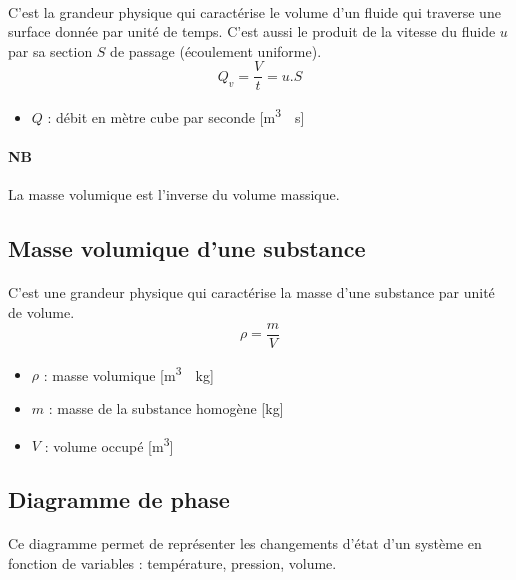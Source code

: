 \documentclass{article}
\begin{document}
            \paragraph{}
            C'est la grandeur physique qui caractérise le volume d'un fluide qui traverse une surface donnée par unité de temps. C'est aussi le produit de la vitesse du fluide $u$ par sa section $S$ de passage (écoulement uniforme).
            $$Q_v = \frac{V}{t} = u.S$$

            \begin{itemize}
                \item $Q$ : débit en mètre cube par seconde [\si{\meter^3 \per \second}]
            \end{itemize}

            \paragraph{NB} La masse volumique est l'inverse du volume massique.

        \subsection{Masse volumique d'une substance}
            \paragraph{}
            C'est une grandeur physique qui caractérise la masse d'une substance par unité de volume.
            $$\rho = \frac{m}{V}$$
            \begin{itemize}
                \item $\rho$ : masse volumique [\si{\meter^3 \per \kilogram}]
                \item $m$ : masse de la substance homogène [\si{\kilogram}]
                \item $V$ : volume occupé [\si{\meter^3}]
            \end{itemize}

        \subsection{Diagramme de phase}
            \paragraph{}
            Ce diagramme permet de représenter les changements d'état d'un système en fonction de variables : température, pression, volume.
\end{document}
